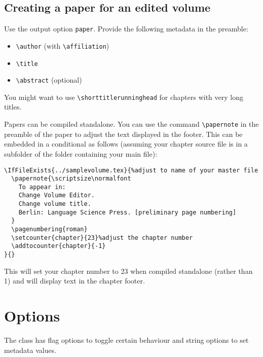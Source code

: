 \documentclass[%
output=guidelines,guidelines]{langscibook}
\begin{document}
\section{Creating a paper for an edited volume}
Use the output option \texttt{paper}. Provide the following metadata in the preamble:
\begin{itemize}
 \item \verb+\author+ (with \verb+\affiliation+)
 \item \verb+\title+
 \item \verb+\abstract+ (optional)
\end{itemize}

You might want to use \verb+\shorttitlerunninghead+ for chapters with very long titles.

Papers can be compiled standalone. You can use the command \verb+\papernote+ in the preamble of the paper to adjust the text displayed in the footer.  This can be embedded in a conditional as follows (assuming your chapter source file is in a subfolder of the folder containing your main file):
\begin{verbatim}
\IfFileExists{../samplevolume.tex}{%adjust to name of your master file
  \papernote{\scriptsize\normalfont
    To appear in:
    Change Volume Editor.
    Change volume title.
    Berlin: Language Science Press. [preliminary page numbering]
  }
  \pagenumbering{roman}
  \setcounter{chapter}{23}%adjust the chapter number
  \addtocounter{chapter}{-1}
}{}
\end{verbatim}

This will set your chapter number to 23 when compiled standalone (rather than 1) and will display text in the chapter footer.




\chapter{Options}
The class has flag options to toggle certain behaviour and string options to set metadata values.
\end{document}
